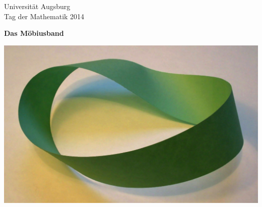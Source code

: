\documentclass[a4paper,ngerman]{scrartcl}
\newcommand{\header}{%
  \begin{raggedleft}
  \tiny Universität Augsburg \\
  Tag der Mathematik 2014 \par
  \end{raggedleft}}
\begin{document}
\header

\begin{center}
  \Huge\bf
  Das Möbiusband
\end{center}

\vspace{8 mm}
\begin{center}
    \includegraphics[scale=0.25]{moebiusband.jpeg}
\end{center}

\renewcommand{\labelitemi}{$\infty$}
\end{document}
